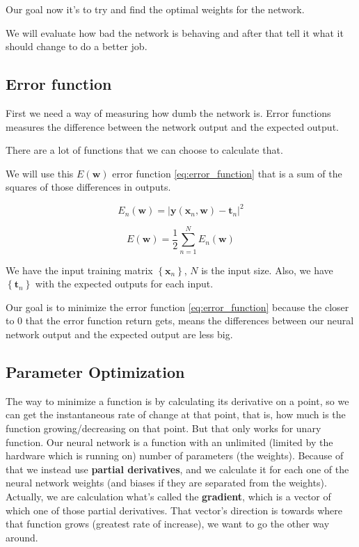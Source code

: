 \documentclass[a4paper,12pt]{article}
\theoremstyle{mytheoremstyle}
\theoremstyle{mytheoremstyle}
\theoremstyle{myproblemstyle}
\begin{document}
    Our goal now it's to try and find the optimal weights for the network.

    We will evaluate how bad the network is behaving and after that tell it
    what it should change to do a better job.

    \subsection{Error function}

    First we need a way of measuring how dumb the network is. Error functions
    measures the difference between the network output and the expected output.

    There are a lot of functions that we can choose to calculate that.

    We will use this $ E \left( \mathbf{w} \right) $ error function
    \eqref{eq:error_function} that is a sum of the squares of those differences
    in outputs.

    \begin{equation}
        E_{n} \left( \mathbf{w} \right) = \left| \mathbf{y}(\mathbf{x}_{n}, \mathbf{w}) - \mathbf{t}_{n} \right|^{2}
    \end{equation}

    \begin{equation}
        E \left( \mathbf{w} \right) = \frac{1}{2} \displaystyle\sum_{n=1}^{N} E_{n}(\mathbf{w})
        \label{eq:error_function}
    \end{equation}

    We have the input training matrix $ \left\{ \mathbf{x}_{n} \right\} $, $ N $
    is the input size. Also, we have $ \left\{ \mathbf{t}_{n} \right\} $ with the
    expected outputs for each input.

    Our goal is to minimize the error function \eqref{eq:error_function}
    because the closer to 0 that the error function return gets, means the
    differences between our neural network output and the expected output are
    less big.

    \subsection{Parameter Optimization}

    The way to minimize a function is by calculating its derivative on a point,
    so we can get the instantaneous rate of change at that point, that is, how
    much is the function growing/decreasing on that point. But that only works
    for unary function. Our neural network is a function with an unlimited
    (limited by the hardware which is running on) number of parameters (the
    weights). Because of that we instead use \textbf{partial derivatives}, and
    we calculate it for each one of the neural network weights (and biases if
    they are separated from the weights). Actually, we are calculation what's
    called the \textbf{gradient}, which is a vector of which one of those
    partial derivatives. That vector's direction is towards where that function
    grows (greatest rate of increase), we want to go the other way around.
\end{document}
